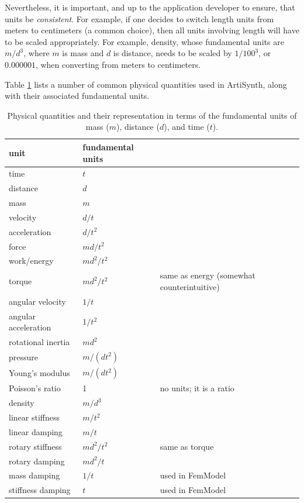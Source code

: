 Nevertheless, it is important, and up to the application developer to
ensure, that units be {\it consistent}. For example, if one decides to
switch length units from meters to centimeters (a common choice),
then all units involving length will have to be scaled appropriately.
For example, density, whose fundamental units are $m/d^3$, where $m$ is mass and
$d$ is distance, needs to be scaled by $1/100^3$, or $0.000001$, when
converting from meters to centimeters.

Table \ref{Units:tab} lists a number of common physical quantities
used in ArtiSynth, along with their associated fundamental units.

\begin{table}
\begin{center}
\begin{tabular}{|lll|}
\hline
unit & fundamental units & \\
\hline
time                    & $t$ & \\
distance                & $d$ & \\
mass                    & $m$ & \\
velocity                & $d/t$ & \\
acceleration            & $d/t^2$ & \\
force                   & $m d/t^2$ & \\
work/energy             & $m d^2/t^2$& \\
torque                  & $m d^2/t^2$ & same as energy (somewhat counterintuitive)\\
angular velocity        & $1/t$ & \\
angular acceleration    & $1/t^2$ & \\
rotational inertia      & $m d^2$ & \\
pressure                & $m/(d t^2)$ & \\
Young's modulus         & $m/(d t^2)$ & \\
Poisson's ratio         & 1 & no units; it is a ratio \\
density                 & $m/d^3$ & \\
linear stiffness        & $m/t^2$ & \\
linear damping          & $m/t$ & \\
rotary stiffness        & $m d^2/t^2$ & same as torque \\
rotary damping          & $m d^2/t$ & \\
mass damping            & $1/t$ & used in FemModel \\
stiffness damping       & $t$ & used in FemModel \\
\hline
\end{tabular}
\end{center}
\caption{Physical quantities and their representation in terms of the
fundamental units of mass ($m$), distance ($d$), and time ($t$).}
\label{Units:tab}
\end{table}


